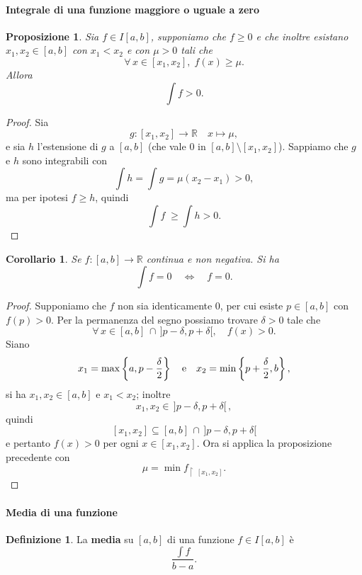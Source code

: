 \documentclass{article}
\theoremstyle{plain}
\newtheorem{prop}[thm]{Proposizione}
\newtheorem{cor}{Corollario}
\theoremstyle{definition}
\newtheorem{defn}{Definizione}[section]
\theoremstyle{remark}
\begin{document}
\vspace{10pt}

\paragraph{Integrale di una funzione maggiore o uguale a zero}
\begin{bxthm}
\begin{prop}
    Sia $f\in I[a,b]$, supponiamo che $f\geq0$ e che inoltre esistano $x_1,x_2\in[a,b]$ con $x_1<x_2$ e con $\mu>0$ tali che 
    \[\forall\,x\in[x_1,x_2],\;f(x)\geq\mu.\]
    Allora 
    \[\int f>0.\]
\end{prop}
\end{bxthm}
\begin{proof}
    Sia 
    \[ g:[x_1,x_2]\to\mathbb{R}\quad x\mapsto\mu, \]
    e sia $h$ l'estensione di $g$ a $[a,b]$ (che vale $0$ in $[a,b]\setminus[x_1,x_2]$).
    Sappiamo che $g$ e $h$ sono integrabili con 
    \[\int h=\int g=\mu(x_2-x_1)>0,\]
    ma per ipotesi $f\geq h$, quindi 
    \[\int f\;\geq\int h>0.\]
\end{proof}

\vspace{10pt}

\begin{bxthm}
\begin{cor}
    Se $f:[a,b]\to\mathbb{R}$ continua e non negativa. 
    Si ha 
    \[\int f=0\quad\iff\quad f=0.\]
\end{cor}
\end{bxthm}
\begin{proof}
    Supponiamo che $f$ non sia identicamente $0$,
    per cui esiste $p\in[a,b]$ con $f(p)>0$. Per la permanenza del segno possiamo trovare $\delta>0$ tale che 
    \[\forall\, x\in[a,b]\,\cap\, ]p-\delta,p+\delta[,\quad f(x)>0.\]
    Siano
    \[ x_1=\max\left\{a,p-\dfrac{\delta}{2}\right\}\quad\textup{e}\quad x_2=\min\left\{p+\dfrac{\delta}{2},b\right\}, \]
    si ha $x_1,x_2\in[a,b]$ e $x_1<x_2$; inoltre 
    \[x_1,x_2\in\,]p-\delta,p+\delta[\,,\]
    quindi 
    \[[x_1,x_2]\subseteq[a,b]\,\cap\, ]p-\delta,p+\delta[\]
    e pertanto $f(x)>0$ per ogni $x\in[x_1,x_2]$.
    Ora si applica la proposizione precedente con 
    \[\mu=\min f_{\upharpoonright \ [x_1,x_2]}.\]
\end{proof}

\vspace{10pt}

\paragraph{Media di una funzione}
\begin{bxthm}
\begin{defn}
    La \textbf{media} su $[a,b]$ di una funzione $f\in I[a,b]$ è 
    \[\dfrac{\int f}{b-a}.\]
\end{defn}
\end{bxthm}
\end{document}

